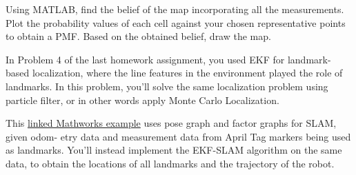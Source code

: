 \documentclass[answers]{exam}
\begin{document}
\begin{questions}
    Using MATLAB, find the belief of the map incorporating all the measurements. Plot the
    probability values of each cell against your chosen representative points to obtain a PMF.
    Based on the obtained belief, draw the map.

    \begin{solution}
    \end{solution}

    \question[25]
    In Problem 4 of the last homework assignment, you used EKF for landmark-based localization, where the line features in the environment played the role of landmarks. In this problem, you'll solve the same localization problem using particle filter, or in other words apply Monte Carlo Localization.

    \begin{solution}
    \end{solution}

    \question[(Bonus) 25]
    This \href{https://www.mathworks.com/help/nav/ug/landmark-slam-using-apriltag-markers.html}{linked Mathworks example} uses pose graph and factor graphs for SLAM, given odom-
    etry data and measurement data from April Tag markers being used as landmarks. You'll
    instead implement the EKF-SLAM algorithm on the same data, to obtain the locations of all
    landmarks and the trajectory of the robot.

    \begin{solution}
    \end{solution}
\end{questions}
\end{document}
